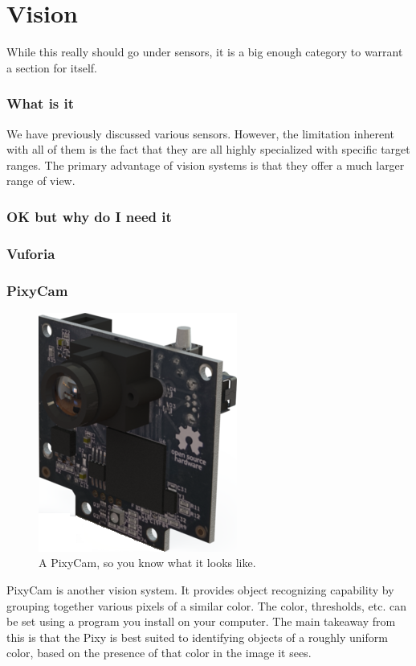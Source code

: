 \documentclass[../main.tex]{subfiles}
\begin{document}
\newpage
\part{Vision}
While this really should go under sensors, it is a big enough category to warrant a section for itself.

\section{What is it}
We have previously discussed various sensors. However, the limitation inherent with all of them is the fact that they are all highly specialized with specific target ranges. The primary advantage of vision systems is that they offer a much larger range of view.
\section{OK but why do I need it}
\section{Vuforia}
\section{PixyCam}
\begin{figure}[H]
    \includegraphics{sections/vision/images/pixy.png}
    \caption{A PixyCam, so you know what it looks like.}
\end{figure}
PixyCam is another vision system. It provides object recognizing capability by grouping together various pixels of a similar color. The color, thresholds, etc. can be set using a program you install on your computer. The main takeaway from this is that the Pixy is best suited to identifying objects of a roughly uniform color, based on the presence of that color in the image it sees.
\end{document}
